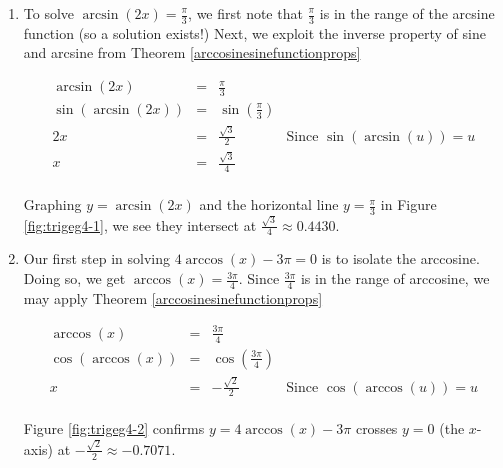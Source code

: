 {
\begin{enumerate}

\item  To solve $\arcsin(2x) = \frac{\pi}{3}$, we first note that $\frac{\pi}{3}$ is in the range of the arcsine function (so a solution exists!) Next, we exploit the inverse property of sine and arcsine from Theorem \ref{arccosinesinefunctionprops}

\[ \begin{array}{rclr}

\arcsin(2x) & = & \frac{\pi}{3} & \\
\sin\left(\arcsin(2x)\right) & = & \sin\left(\frac{\pi}{3}\right) & \\ [5pt]
2x & = & \frac{\sqrt{3}}{2} & \text{Since $\sin(\arcsin(u)) = u$} \\ [5pt]
x & = & \frac{\sqrt{3}}{4} & \\ \end{array} \]



Graphing $y = \arcsin(2x)$ and the horizontal line $y = \frac{\pi}{3}$ in Figure \ref{fig:trigeg4-1}, we see they intersect at $\frac{\sqrt{3}}{4} \approx 0.4430$.


\item Our first step in solving $4\arccos(x)-3\pi = 0$ is to isolate the arccosine. Doing so, we get $\arccos(x) = \frac{3\pi}{4}$.  Since $\frac{3\pi}{4}$ is in the range of arccosine, we may apply Theorem \ref{arccosinesinefunctionprops}

\[ \begin{array}{rclr}

\arccos(x) & = & \frac{3\pi}{4} & \\ [5pt]
\cos\left(\arccos(x)\right) & = & \cos\left(\frac{3\pi}{4}\right) & \\ [5pt]
x & = & -\frac{\sqrt{2}}{2} & \text{Since $\cos(\arccos(u)) = u$} \\ \end{array} \]



Figure \ref{fig:trigeg4-2} confirms $y = 4\arccos(x) - 3\pi$ crosses $y = 0$ (the $x$-axis) at $-\frac{\sqrt{2}}{2} \approx -0.7071$.





\end{enumerate}}
